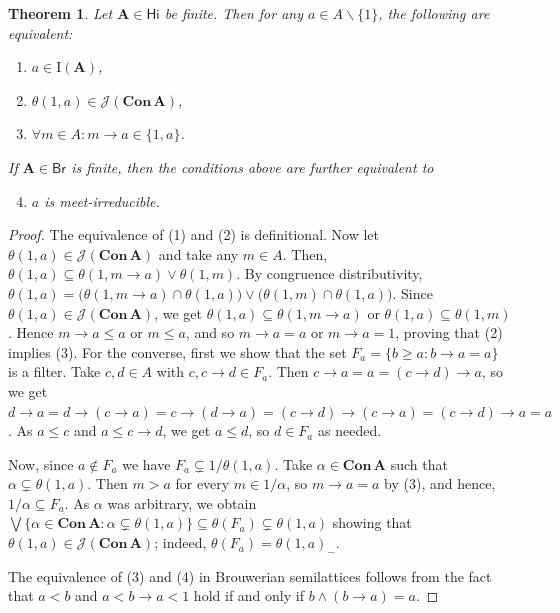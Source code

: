 \documentclass{amsart}
\newtheorem{theorem}{Theorem}[section]
\newcommand{\alg}[1]{\mathbf{#1}}
\newcommand{\var}[1]{\mathsf{#1}}
\newcommand{\Con}[1]{\mathbf{Con}\, #1}
\newcommand{\J}[1]{\mathcal{J}(#1)}
\newcommand{\irr}[1]{\mathrm{I}(#1)}
\def\ra{\rightarrow}
\begin{document}
\begin{theorem}\label{thm:irreducible-charact}
Let $\alg{A}\in\var{Hi}$ be finite. Then for any $a\in A\smallsetminus\{1\}$,
the following are equivalent:
\begin{enumerate}
\item $a\in \irr{\alg{A}}$,  
\item $\theta(1,a)\in \J{\Con{\alg{A}}}$,
\item $\forall m\in A: m\ra a\in\{1,a\}$. 
\end{enumerate}
If $\alg{A}\in\var{Br}$ is finite, then the conditions above are
further equivalent to
\begin{enumerate}
\setcounter{enumi}{3}  
\item $a$ is meet-irreducible. 
\end{enumerate}  
\end{theorem}

\begin{proof}
The equivalence of (1) and (2) is definitional. Now let
$\theta(1,a)\in\J{\Con{\alg{A}}}$ and take any $m\in A$. Then,
$\theta(1,a)\subseteq \theta(1,m\ra a)\vee\theta(1,m)$. By congruence
distributivity, $\theta(1,a) =
\bigl(\theta(1,m\ra a)\cap\theta(1,a))\vee(\theta(1,m)\cap\theta(1,a)\bigr)$.
Since $\theta(1,a)\in\J{\Con{\alg{A}}}$, we get
$\theta(1,a)\subseteq \theta(1,m\ra a)$ or
$\theta(1,a)\subseteq \theta(1,m)$. Hence $m\ra a\leq a$ or
$m\leq a$, and so $m\ra a = a$ or $m\ra a = 1$, proving that (2) implies (3).
For the converse, first we show that the set $F_a = \{b\geq a: b\ra a = a\}$ is
a filter. 
Take $c,d\in A$ with $c, c\ra d\in F_a$. Then
$c\ra a = a = (c\ra d)\ra a$, so we get
$d\ra a = d\ra (c\ra a) = c\ra (d\ra a) = (c\ra d)\ra(c\ra a) =
(c\ra d)\ra a = a$. As $a\leq c$ and $a\leq c\ra d$, we get 
$a\leq d$, so $d\in F_a$ as needed.

Now, since $a\notin F_a$ we have 
$F_a\subsetneq 1/\theta(1,a)$. Take $\alpha\in \Con{\alg{A}}$ such that
$\alpha\subsetneq \theta(1,a)$. Then $m>a$ for every $m\in 1/\alpha$,
so $m\ra a = a$ by (3), and hence,
$1/\alpha\subseteq F_a$. As $\alpha$ was arbitrary, we obtain
$\bigvee\{\alpha\in\Con{\alg{A}}: \alpha\subsetneq \theta(1,a)\}
\subseteq \theta(F_a) \subsetneq \theta(1,a)$ showing that
$\theta(1,a)\in \J{\Con{\alg{A}}}$; indeed, $\theta(F_a) = \theta(1,a)_-$.

The equivalence of (3) and (4) in Brouwerian semilattices follows from
the fact that $a< b$ and $a < b\ra a < 1$ hold if and only if
$b\wedge(b\ra a) = a$.
\end{proof}
\end{document}
